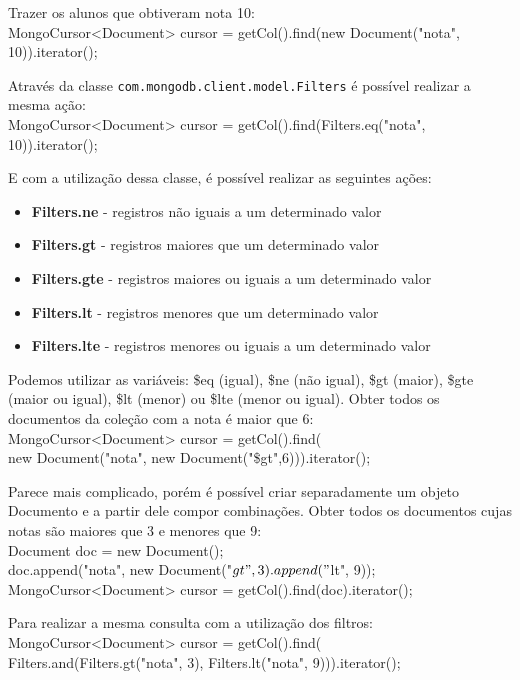 \documentclass[a4paper,11pt]{article}
\begin{document}
Trazer os alunos que obtiveram nota 10: \\
{\ttfamily MongoCursor<Document> cursor = getCol().find(new Document("nota", 10)).iterator();}

Através da classe \texttt{com.mongodb.client.model.Filters} é possível realizar a mesma ação: \\
{\ttfamily MongoCursor<Document> cursor = getCol().find(Filters.eq("nota", 10)).iterator();}

E com a utilização dessa classe, é possível realizar as seguintes ações:
\begin{itemize}[nolistsep]
  \item \textbf{Filters.ne} - registros não iguais a um determinado valor
  \item \textbf{Filters.gt} - registros maiores que um determinado valor
  \item \textbf{Filters.gte} - registros maiores ou iguais a um determinado valor
  \item \textbf{Filters.lt} - registros menores que um determinado valor
  \item \textbf{Filters.lte} - registros menores ou iguais a um determinado valor
\end{itemize}

Podemos utilizar as variáveis: \$eq (igual), \$ne (não igual), \$gt (maior), \$gte (maior ou igual), \$lt (menor) ou \$lte (menor ou igual). Obter todos os documentos da coleção com a nota é maior que 6: \\
{\ttfamily MongoCursor<Document> cursor = getCol().find( \\
	new Document("nota", new  Document("\$gt",6))).iterator(); } 

Parece mais complicado, porém é possível criar separadamente um objeto Documento e a partir dele compor combinações. Obter todos os documentos cujas notas são maiores que 3 e menores que 9: \\
{\ttfamily Document doc = new Document(); \\
doc.append("nota", new Document("$gt", 3).append("$lt", 9)); \\
MongoCursor<Document> cursor = getCol().find(doc).iterator();}

Para realizar a mesma consulta com a utilização dos filtros: \\
{\ttfamily MongoCursor<Document> cursor = getCol().find( \\
	Filters.and(Filters.gt("nota", 3), Filters.lt("nota", 9))).iterator();}
\end{document}
